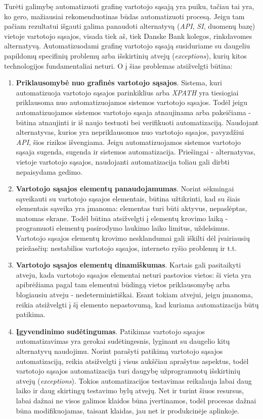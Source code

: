 \documentclass{VUMIFPSBakPrakAt}
\begin{document}
Turėti galimybę automatizuoti grafinę vartotojo sąsają yra puiku, tačiau tai yra, ko gero, mažiausiai rekomenduotinas būdas automatizuoti procesą. Jeigu tam pačiam rezultatui išgauti galima panaudoti alternatyvą (\textit{API}, \textit{SI}, duomenų bazę) vietoje vartotojo sąsajos, visada tiek aš, tiek Danske Bank kolegos, rinkdavomes alternatyvą. Automatizuodami grafinę vartotojo sąsają susiduriame su daugeliu papildomų specifinių problemų arba išskirtinių atvejų (\textit{exceptions}), kurių kitos technologijos fundamentaliai neturi. O į šias problemas atsižvelgti būtina:
\vspace{10pt}
\begin{enumerate}
    \item \textbf{Priklausomybė nuo grafinės vartotojo sąsajos}. Sistema, kuri automatizuoja vartotojo sąsajos parinkiklius arba \textit{XPATH} yra tiesiogiai priklausoma nuo automatizuojamos sistemos vartotojo sąsajos. Todėl jeigu automatizuojamos sistemos vartotojo sąsaja atnaujinama arba pakeičiama - būtina atnaujinti ir iš naujo testuoti bei verifikuoti automatizaciją. Naudojant alternatyvas, kurios yra nepriklausomos nuo vartotojo sąsajos, pavyzdžiui \textit{API}, šios rizikos išvengiama. Jeigu automatizuojamos sistemos vartotojo sąsaja sugenda, sugenda ir sistemos automatizacija. Priešingai - alternatyvas, vietoje vartotojo sąsajos, naudojanti automatizacija toliau gali dirbti nepaisydama gedimo.
    \item \textbf{Vartotojo sąsajos elementų panaudojamumas}. Norint sėkmingai sąveikauti su vartotojo sąsajos elementais, būtina užtikrinti, kad su šiais elementais sąveika yra įmanoma: elementas turi būti aktyvus, nepaslėptas, matomas ekrane. Todėl būtina atsižvelgti į elementų krovimo laiką - programuoti elementų pasirodymo laukimo laiko limitus, uždelsimus. Vartotojo sąsajos elementų krovimo nesklandumai gali iškilti dėl įvairiausių priežasčių: nestabilios vartotojo sąsajos, interneto ryšio problemų ir t.t.
    \item \textbf{Vartotojo sąsajos elementų dinamiškumas}. Kartais gali pasitaikyti atveju, kada vartotojo sąsajos elementai neturi pastovios vietos: ši vieta yra apibrėžiama pagal tam elementui būdingą vietos priklausomybę arba blogiausiu atveju - nedeterministiškai. Esant tokiam atvejui, jeigu įmanoma, reikia atsižvelgti į šį elemento nepastovumą, kad kuriama automatizacija būtų patikima.
    \item \textbf{Įgyvendinimo sudėtingumas}. Patikimas vartotojo sąsajos automatizavimas yra gerokai sudėtingesnis, lyginant su daugelio kitų alternatyvų naudojimu. Norint parašyti patikimą vartotojo sąsajos automatizaciją, reikia atsižvelgti į visus aukščiau aprašytus aspektus, todėl vartotojo sąsajos automatizacija turi daugybę užprogramuotų išskirtinių atvejų (\textit{exceptions}). Tokios automatizacijos testavimas reikalauja labai daug laiko ir daug skirtingų testavimo bylų atvejų. Net ir turint šiuos resursus, labai dažnai ne visos galimos klaidos būna įvertinamos, todėl procesas dažnai būna modifikuojamas, taisant klaidas, jau net ir produkcinėje aplinkoje.
\end{enumerate}
\end{document}
